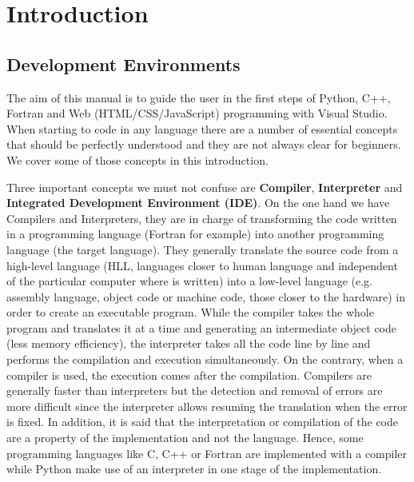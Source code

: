 \chapter{Introduction}


\vspace{1cm}
\section{Development Environments}

The aim of this manual is to guide the user in the first steps of Python, C++, Fortran and Web (HTML/CSS/JavaScript) programming with Visual Studio. When starting to code in any language there are a number of essential concepts that should be perfectly understood and they are not always clear for beginners. We cover some of those concepts in this introduction. 

Three important concepts we must not confuse are \textbf{Compiler}, \textbf{Interpreter} and \textbf{Integrated Development Environment (IDE)}. On the one hand we have Compilers and Interpreters, they are in charge of transforming the code written in a programming language (Fortran for example) into another programming language (the target language). They generally translate the source code from a high-level language (HLL, languages closer to human language and independent of the particular computer where is written) into a low-level language (e.g. assembly language, object code or machine code, those closer to the hardware) in order to create an executable program. While the compiler takes the whole program and translates it at a time and generating an intermediate object code (less memory efficiency), the interpreter takes all the code line by line and performs the compilation and execution simultaneously. On the contrary, when a compiler is used, the execution comes after the compilation. Compilers are generally faster than interpreters but the detection and removal of errors are more difficult since the interpreter allows resuming the translation when the error is fixed. In addition, it is said that the interpretation or compilation of the code are a property of the implementation and not the language. Hence, some programming languages like C, C++ or Fortran are implemented with a compiler while Python make use of an interpreter in one stage of the implementation. 

